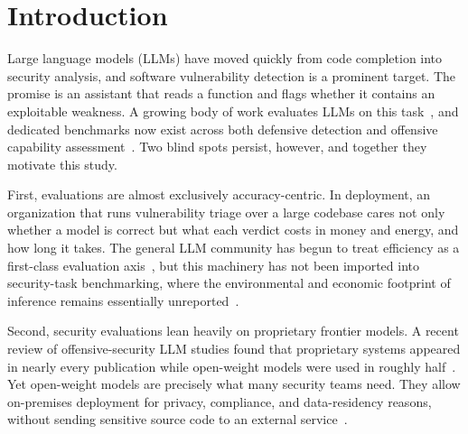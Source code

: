 \documentclass[computers,article,submit,moreauthors]{Definitions/mdpi}
\begin{document}
\section{Introduction}

Large language models (LLMs) have moved quickly from code completion into security analysis, and software vulnerability detection is a prominent target. The promise is an assistant that reads a function and flags whether it contains an exploitable weakness. A growing body of work evaluates LLMs on this task~\citep{primevul,secvuleval,cyberseceval}, and dedicated benchmarks now exist across both defensive detection and offensive capability assessment~\citep{happe-review}. Two blind spots persist, however, and together they motivate this study.

First, evaluations are almost exclusively accuracy-centric. In deployment, an organization that runs vulnerability triage over a large codebase cares not only whether a model is correct but what each verdict costs in money and energy, and how long it takes. The general LLM community has begun to treat efficiency as a first-class evaluation axis~\citep{helm,mlperfpower,tokenpowerbench}, but this machinery has not been imported into security-task benchmarking, where the environmental and economic footprint of inference remains essentially unreported~\citep{happe-review}.

Second, security evaluations lean heavily on proprietary frontier models. A recent review of offensive-security LLM studies found that proprietary systems appeared in nearly every publication while open-weight models were used in roughly half~\citep{happe-review}. Yet open-weight models are precisely what many security teams need. They allow on-premises deployment for privacy, compliance, and data-residency reasons, without sending sensitive source code to an external service~\citep{smallsec}.
\end{document}
